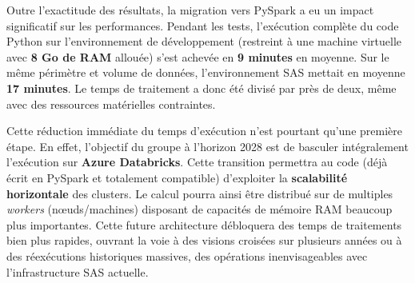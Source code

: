 Outre l'exactitude des résultats, la migration vers PySpark a eu un impact significatif sur les performances. Pendant les tests, l'exécution complète du code Python sur l'environnement de développement (restreint à une machine virtuelle avec \textbf{8 Go de RAM} allouée) s'est achevée en \textbf{9 minutes} en moyenne. Sur le même périmètre et volume de données, l'environnement SAS mettait en moyenne \textbf{17 minutes}. Le temps de traitement a donc été divisé par près de deux, même avec des ressources matérielles contraintes.

Cette réduction immédiate du temps d'exécution n'est pourtant qu'une première étape. En effet, l'objectif du groupe à l'horizon 2028 est de basculer intégralement l'exécution sur \textbf{Azure Databricks}. Cette transition permettra au code (déjà écrit en PySpark et totalement compatible) d'exploiter la \textbf{scalabilité horizontale} des clusters. Le calcul pourra ainsi être distribué sur de multiples \textit{workers} (nœuds/machines) disposant de capacités de mémoire RAM beaucoup plus importantes. Cette future architecture débloquera des temps de traitements bien plus rapides, ouvrant la voie à des visions croisées sur plusieurs années ou à des réexécutions historiques massives, des opérations inenvisageables avec l'infrastructure SAS actuelle.


